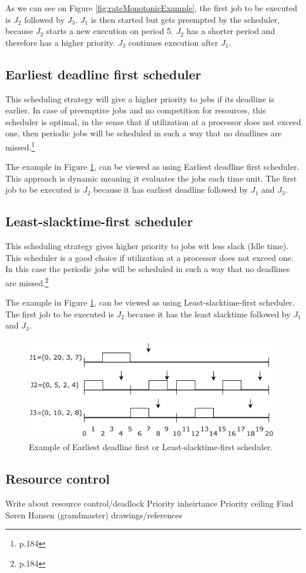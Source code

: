 As we can see on Figure \ref{fig:rateMonotonicExample}, the first job to be executed is $J_2$ followed by $J_3$. $J_1$ is then started but gets preempted by the scheduler, because $J_2$ starts a new execution on period 5. $J_2$ has a shorter period and therefore has a higher priority. $J_3$ continues execution after $J_1$.

\subsection{Earliest deadline first scheduler}
This scheduling strategy will give a higher priority to jobs if its deadline is
earlier. In case of preemptive jobs and no competition for resources, this scheduler
is optimal, in the sense that if utilization at a processor does not exceed one, then
periodic jobs will be scheduled in such a way that no deadlines are missed.\footnote{\cite{Fokkink1965} p.184}

The example in Figure \ref{fig:EarliestDeadlineFirstAndLeastSlacktimeFirstSchedulerExample}, can be viewed as using Earliest deadline first scheduler. This approach is dynamic meaning it evaluates the jobs each time unit. The first job to be executed is $J_2$ because it has earliest deadline followed by $J_1$ and $J_3$.

\subsection{Least-slacktime-first scheduler}
This scheduling strategy gives higher priority to jobs wit less slack (Idle time). This scheduler is a good choice if utilization at a processor does not exceed one. In this case the periodic jobs will be scheduled in such a way that no deadlines are missed.\footnote{\cite{Fokkink1965} p.184}

The example in Figure \ref{fig:EarliestDeadlineFirstAndLeastSlacktimeFirstSchedulerExample}, can be viewed as using Least-slacktime-first scheduler. The first job to be executed is $J_2$ because it has the least slacktime followed by $J_1$ and $J_3$.

\begin{figure}[h!]\label{}
	\centering
	\includegraphics[scale=0.5]{realTimeComputing/fig/EarliestDeadlineFirst.png}
	\caption{Example of Earliest deadline first or Least-slacktime-first scheduler.}
	\label{fig:EarliestDeadlineFirstAndLeastSlacktimeFirstSchedulerExample}
\end{figure}

\subsection{Resource control}
Write about resource control/deadlock
Priority inheirtance
Priority ceiling
Find Søren Hansen (grandmaster) drawings/references